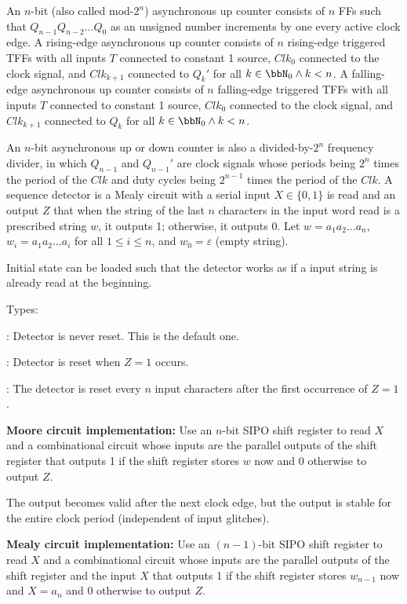 \documentclass[a4paper,12pt]{report}
\begin{document}
An $n$-bit (also called mod-$2^n$) asynchronous up counter consists of $n$ FFs such that $Q_{n-1}Q_{n-2}\ldots Q_0$ as an unsigned number increments by one every active clock edge. A rising-edge asynchronous up counter consists of $n$ rising-edge triggered TFFs with all inputs $T$ connected to constant 1 source, $Clk_0$ connected to the clock signal, and $Clk_{k+1}$ connected to $Q_k'$ for all $k\in\bbN_0\land k<n$. A falling-edge asynchronous up counter consists of $n$ falling-edge triggered TFFs with all inputs $T$ connected to constant 1 source, $Clk_0$ connected to the clock signal, and $Clk_{k+1}$ connected to $Q_k$ for all $k\in\bbN_0\land k<n$.

An $n$-bit asynchronous up or down counter is also a divided-by-$2^n$ frequency divider, in which $Q_{n-1}$ and $Q_{n-1}'$ are clock signals whose periods being $2^n$ times the period of the $Clk$ and duty cycles being $2^{n-1}$ times the period of the $Clk$.
A sequence detector is a Mealy circuit with a serial input $X\in\{0,1\}$ is read and an output $Z$ that when the string of the last $n$ characters in the input word read is a prescribed string $w$, it outputs 1; otherwise, it outputs 0. Let $w=a_1a_2\ldots a_n$, $w_i=a_1a_2\ldots a_i$ for all $1\leq i\leq n$, and $w_0=\varepsilon$ (empty string).

Initial state can be loaded such that the detector works as if a input string is already read at the beginning.

Types:
\bit
\item {}: Detector is never reset. This is the default one.
\item {}: Detector is reset when $Z=1$ occurs.
\item {}: The detector is reset every $n$ input characters after the first occurrence of $Z=1$.
\eit
{}
\bit
\item \textbf{Moore circuit implementation:} Use an $n$-bit SIPO shift register to read $X$ and a combinational circuit whose inputs are the parallel outputs of the shift register that outputs 1 if the shift register stores $w$ now and 0 otherwise to output $Z$.

The output becomes valid after the next clock edge, but the output is stable for the entire clock period (independent of input glitches).
\item \textbf{Mealy circuit implementation:} Use an $(n-1)$-bit SIPO shift register to read $X$ and a combinational circuit whose inputs are the parallel outputs of the shift register and the input $X$ that outputs 1 if the shift register stores $w_{n-1}$ now and $X=a_n$ and 0 otherwise to output $Z$.
\end{document}
